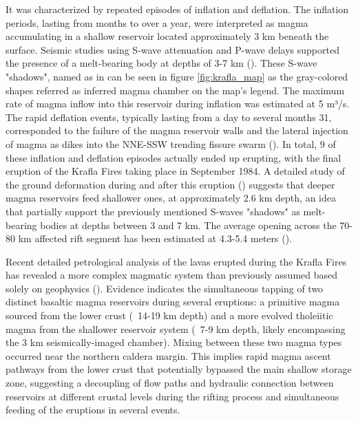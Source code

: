 It was characterized by repeated episodes of inflation and deflation. The inflation periods, lasting from months to over a year, were interpreted as magma accumulating in a shallow reservoir located approximately 3 km beneath the surface. Seismic studies using S-wave attenuation and P-wave delays supported the presence of a melt-bearing body at depths of 3-7 km (\cite{einarsson1978}). These S-wave "shadows", named as in \cite{arnason2020} can be seen in figure \ref{fig:krafla_map} as the gray-colored shapes referred as inferred magma chamber on the map's legend. The maximum rate of magma inflow into this reservoir during inflation was estimated at 5 m³/s. The rapid deflation events, typically lasting from a day to several months 31, corresponded to the failure of the magma reservoir walls and the lateral injection of magma as dikes into the NNE-SSW trending fissure swarm (\cite{einarsson1980}). In total, 9 of these inflation and deflation episodes actually ended up erupting, with the final eruption of the Krafla Fires taking place in September 1984. A detailed study of the ground deformation during and after this eruption (\cite{tryggvason1986}) suggests that deeper magma reservoirs feed shallower ones, at approximately 2.6 km depth, an idea that partially support the previously mentioned S-waves "shadows" as melt-bearing bodies at depths between 3 and 7 km. The average opening across the 70-80 km affected rift segment has been estimated at 4.3-5.4 meters (\cite{hollingsworth2012}). 

Recent detailed petrological analysis of the lavas erupted during the Krafla Fires has revealed a more complex magmatic system than previously assumed based solely on geophysics (\cite{rooyakkers2024}). Evidence indicates the simultaneous tapping of two distinct basaltic magma reservoirs during several eruptions: a primitive magma sourced from the lower crust (~14-19 km depth) and a more evolved tholeiitic magma from the shallower reservoir system (~7-9 km depth, likely encompassing the 3 km seismically-imaged chamber). Mixing between these two magma types occurred near the northern caldera margin. This implies rapid magma ascent pathways from the lower crust that potentially bypassed the main shallow storage zone, suggesting a decoupling of flow paths and hydraulic connection between reservoirs at different crustal levels during the rifting process and simultaneous feeding of the eruptions in several events.

